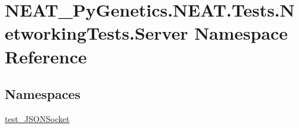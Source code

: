 \hypertarget{namespaceNEAT__PyGenetics_1_1NEAT_1_1Tests_1_1NetworkingTests_1_1Server}{}\section{N\+E\+A\+T\+\_\+\+Py\+Genetics.\+N\+E\+A\+T.\+Tests.\+Networking\+Tests.\+Server Namespace Reference}
\label{namespaceNEAT__PyGenetics_1_1NEAT_1_1Tests_1_1NetworkingTests_1_1Server}
\subsection*{Namespaces}
\begin{DoxyCompactItemize}
\item 
 \hyperlink{namespaceNEAT__PyGenetics_1_1NEAT_1_1Tests_1_1NetworkingTests_1_1Server_1_1test__JSONSocket}{test\+\_\+\+J\+S\+O\+N\+Socket}
\end{DoxyCompactItemize}
